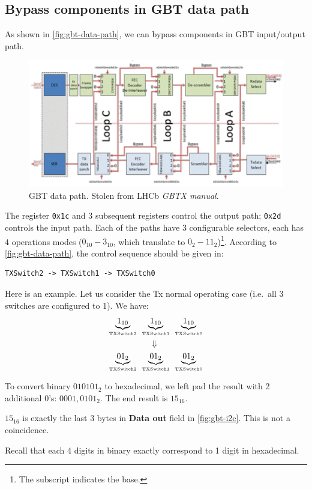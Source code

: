 \subsection{Bypass components in GBT data path}
As shown in \autoref{fig:gbt-data-path}, we can bypass components in GBT
input/output path.

\begin{figure}[ht]
    \centering
    \includegraphics[width=\textwidth]{res/gbtx_data_path_block_diagram.pdf}
    \caption{GBT data path. Stolen from LHCb \emph{GBTX manual}.}
    \label{fig:gbt-data-path}
\end{figure}

The register \texttt{0x1c} and 3 subsequent registers control the output path;
\texttt{0x2d} controls the input path.
Each of the paths have 3 configurable selectors, each has 4 operations modes
($0_{10} - 3_{10}$, which translate to $0_2 - 11_2$)\footnote{
    The subscript indicates the base.
}.
According to \autoref{fig:gbt-data-path}, the control sequence should be given
in:

\begin{lstlisting}
TXSwitch2 -> TXSwitch1 -> TXSwitch0
\end{lstlisting}

Here is an example.
Let us consider the Tx normal operating case (i.e.\ all 3 switches are
configured to 1). We have:
\begin{align*}
    \underbrace{1_{10}}_{\text{\tiny ~TXSwitch2~}}
    &\underbrace{1_{10}}_{\text{\tiny ~TXSwitch1~}}
    \underbrace{1_{10}}_{\text{\tiny ~TXSwitch0~}} \\
    &\symbolwithin{\Downarrow}{\text{\tiny ~TXSwitch0~}} \\
    \underbrace{01_{2}}_{\text{\tiny ~TXSwitch2~}}
    &\underbrace{01_{2}}_{\text{\tiny ~TXSwitch1~}}
    \underbrace{01_{2}}_{\text{\tiny ~TXSwitch0~}} \\
\end{align*}

To convert binary $010101_2$ to hexadecimal, we left pad the result with 2
additional 0's: $0001,0101_2$. The end result is $15_{16}$.

\begin{leftbar}
    $15_{16}$ is exactly the last 3 bytes in \textbf{Data out} field in
    \autoref{fig:gbt-i2c}.
    This is not a coincidence.
\end{leftbar}

\begin{leftbar}
    Recall that each 4 digits in binary exactly correspond to 1 digit in
    hexadecimal.
\end{leftbar}
